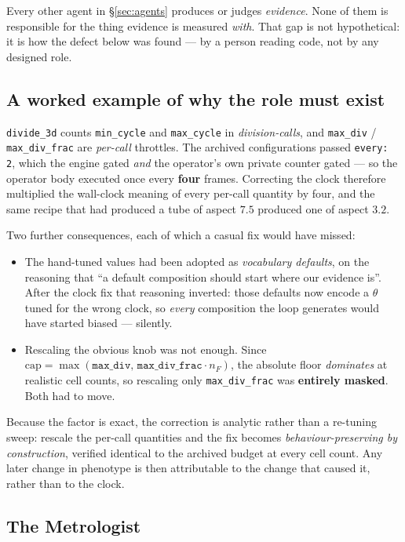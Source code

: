 \documentclass[11pt]{article}
\newcommand{\code}[1]{\texttt{#1}}
\begin{document}
Every other agent in \S\ref{sec:agents} produces or judges \emph{evidence}. None of them is
responsible for the thing evidence is measured \emph{with}. That gap is not hypothetical: it is
how the defect below was found --- by a person reading code, not by any designed role.

\subsection{A worked example of why the role must exist}

\code{divide\_3d} counts \code{min\_cycle} and \code{max\_cycle} in \emph{division-calls}, and
\code{max\_div} / \code{max\_div\_frac} are \emph{per-call} throttles. The archived configurations
passed \code{every: 2}, which the engine gated \emph{and} the operator's own private counter gated
--- so the operator body executed once every \textbf{four} frames. Correcting the clock therefore
multiplied the wall-clock meaning of every per-call quantity by four, and the same recipe that had
produced a tube of aspect $7.5$ produced one of aspect $3.2$.

Two further consequences, each of which a casual fix would have missed:

\begin{itemize}\itemsep2pt
\item The hand-tuned values had been adopted as \emph{vocabulary defaults}, on the reasoning that
``a default composition should start where our evidence is''. After the clock fix that reasoning
inverted: those defaults now encode a $\theta$ tuned for the wrong clock, so \emph{every}
composition the loop generates would have started biased --- silently.
\item Rescaling the obvious knob was not enough. Since
$\text{cap} = \max(\code{max\_div},\, \code{max\_div\_frac}\cdot n_F)$, the absolute floor
\emph{dominates} at realistic cell counts, so rescaling only \code{max\_div\_frac} was
\textbf{entirely masked}. Both had to move.
\end{itemize}

Because the factor is exact, the correction is analytic rather than a re-tuning sweep: rescale the
per-call quantities and the fix becomes \emph{behaviour-preserving by construction}, verified
identical to the archived budget at every cell count. Any later change in phenotype is then
attributable to the change that caused it, rather than to the clock.

\subsection{The Metrologist}
\end{document}
